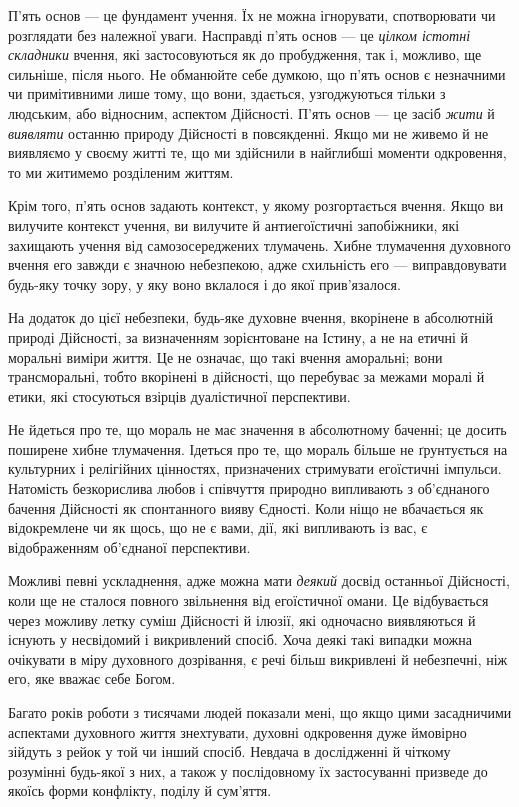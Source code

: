 П'ять основ — це фундамент учення. Їх не можна ігнорувати, спотворювати чи розглядати без належної уваги. Насправді п'ять основ — це \emph{цілком істотні складники} вчення, які застосовуються як до пробудження, так і, можливо, ще сильніше, після нього. Не обманюйте себе думкою, що п'ять основ є незначними чи примітивними лише тому, що вони, здається, узгоджуються тільки з людським, або відносним, аспектом Дійсності. П'ять основ — це засіб \emph{жити} й \emph{виявляти} останню природу Дійсності в повсякденні. Якщо ми не живемо й не виявляємо у своєму житті те, що ми здійснили в найглибші моменти одкровення, то ми житимемо розділеним життям.

Крім того, п'ять основ задають контекст, у якому розгортається вчення. Якщо ви вилучите контекст учення, ви вилучите й антиегоїстичні запобіжники, які захищають учення від самозосереджених тлумачень. Хибне тлумачення духовного вчення его завжди є значною небезпекою, адже схильність его — виправдовувати будь-яку точку зору, у яку воно вклалося і до якої прив'язалося.

На додаток до цієї небезпеки, будь-яке духовне вчення, вкорінене в абсолютній природі Дійсності, за визначенням зорієнтоване на Істину, а не на етичні й моральні виміри життя. Це не означає, що такі вчення аморальні; вони трансморальні, тобто вкорінені в дійсності, що перебуває за межами моралі й етики, які стосуються взірців дуалістичної перспективи.

Не йдеться про те, що мораль не має значення в абсолютному баченні; це досить поширене хибне тлумачення. Ідеться про те, що мораль більше не ґрунтується на культурних і релігійних цінностях, призначених стримувати егоїстичні імпульси. Натомість безкорислива любов і співчуття природно випливають з об'єднаного бачення Дійсності як спонтанного вияву Єдності. Коли ніщо не вбачається як відокремлене чи як щось, що не є вами, дії, які випливають із вас, є відображенням об'єднаної перспективи.

Можливі певні ускладнення, адже можна мати \emph{деякий} досвід останньої Дійсності, коли ще не сталося повного звільнення від егоїстичної омани. Це відбувається через можливу летку суміш Дійсності й ілюзії, які одночасно виявляються й існують у несвідомий і викривлений спосіб. Хоча деякі такі випадки можна очікувати в міру духовного дозрівання, є речі більш викривлені й небезпечні, ніж его, яке вважає себе Богом.

Багато років роботи з тисячами людей показали мені, що якщо цими засадничими аспектами духовного життя знехтувати, духовні одкровення дуже ймовірно зійдуть з рейок у той чи інший спосіб. Невдача в дослідженні й чіткому розумінні будь-якої з них, а також у послідовному їх застосуванні призведе до якоїсь форми конфлікту, поділу й сум'яття.

